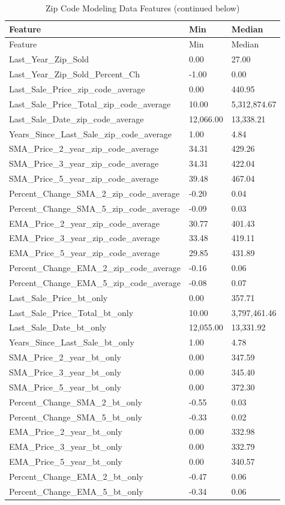 \documentclass[]{article}
\begin{document}
\begin{longtable}[]{@{}lll@{}}
\caption{Zip Code Modeling Data Features (continued
below)}\tabularnewline
\toprule
Feature & Min & Median\tabularnewline
\midrule
\endfirsthead
\toprule
Feature & Min & Median\tabularnewline
\midrule
\endhead
Last\_Year\_Zip\_Sold & 0.00 & 27.00\tabularnewline
Last\_Year\_Zip\_Sold\_Percent\_Ch & -1.00 & 0.00\tabularnewline
Last\_Sale\_Price\_zip\_code\_average & 0.00 & 440.95\tabularnewline
Last\_Sale\_Price\_Total\_zip\_code\_average & 10.00 &
5,312,874.67\tabularnewline
Last\_Sale\_Date\_zip\_code\_average & 12,066.00 &
13,338.21\tabularnewline
Years\_Since\_Last\_Sale\_zip\_code\_average & 1.00 &
4.84\tabularnewline
SMA\_Price\_2\_year\_zip\_code\_average & 34.31 & 429.26\tabularnewline
SMA\_Price\_3\_year\_zip\_code\_average & 34.31 & 422.04\tabularnewline
SMA\_Price\_5\_year\_zip\_code\_average & 39.48 & 467.04\tabularnewline
Percent\_Change\_SMA\_2\_zip\_code\_average & -0.20 &
0.04\tabularnewline
Percent\_Change\_SMA\_5\_zip\_code\_average & -0.09 &
0.03\tabularnewline
EMA\_Price\_2\_year\_zip\_code\_average & 30.77 & 401.43\tabularnewline
EMA\_Price\_3\_year\_zip\_code\_average & 33.48 & 419.11\tabularnewline
EMA\_Price\_5\_year\_zip\_code\_average & 29.85 & 431.89\tabularnewline
Percent\_Change\_EMA\_2\_zip\_code\_average & -0.16 &
0.06\tabularnewline
Percent\_Change\_EMA\_5\_zip\_code\_average & -0.08 &
0.07\tabularnewline
Last\_Sale\_Price\_bt\_only & 0.00 & 357.71\tabularnewline
Last\_Sale\_Price\_Total\_bt\_only & 10.00 & 3,797,461.46\tabularnewline
Last\_Sale\_Date\_bt\_only & 12,055.00 & 13,331.92\tabularnewline
Years\_Since\_Last\_Sale\_bt\_only & 1.00 & 4.78\tabularnewline
SMA\_Price\_2\_year\_bt\_only & 0.00 & 347.59\tabularnewline
SMA\_Price\_3\_year\_bt\_only & 0.00 & 345.40\tabularnewline
SMA\_Price\_5\_year\_bt\_only & 0.00 & 372.30\tabularnewline
Percent\_Change\_SMA\_2\_bt\_only & -0.55 & 0.03\tabularnewline
Percent\_Change\_SMA\_5\_bt\_only & -0.33 & 0.02\tabularnewline
EMA\_Price\_2\_year\_bt\_only & 0.00 & 332.98\tabularnewline
EMA\_Price\_3\_year\_bt\_only & 0.00 & 332.79\tabularnewline
EMA\_Price\_5\_year\_bt\_only & 0.00 & 340.57\tabularnewline
Percent\_Change\_EMA\_2\_bt\_only & -0.47 & 0.06\tabularnewline
Percent\_Change\_EMA\_5\_bt\_only & -0.34 & 0.06\tabularnewline
\bottomrule
\end{longtable}
\end{document}

